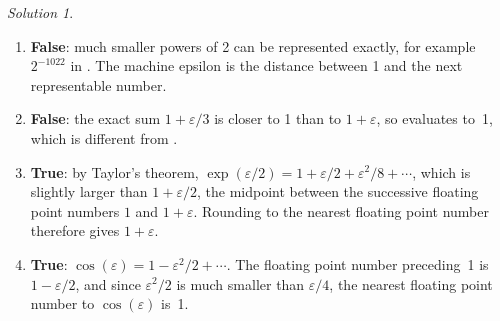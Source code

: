 \documentclass[10pt]{article}
\theoremstyle{definition}
\theoremstyle{remark}
\newtheorem*{protosolution}{Solution}
\newenvironment{solutionframe}
{%
    \begin{mdframed}[
        leftmargin=1cm,
        skipabove=.3cm,
        linecolor=blue,
        backgroundcolor=lightgreen,
        linewidth=0pt,
        innerleftmargin=.5em,
        innerrightmargin=.5em,
        innertopmargin=.3em,
        innerbottommargin=.6em,
    ]
}
{
    \end{mdframed}
}
\newenvironment{solution}
{\pushQED{\qed}\renewcommand{\qedsymbol}{$\triangle$}
\begin{solutionframe}\small \begin{protosolution}}
{\popQED\end{protosolution}\end{solutionframe}}
\begin{document}
\begin{solution}
\begin{enumerate}
        \item \textbf{False}:
            much smaller powers of 2 can be represented exactly,
            for example $2^{-1022}$ in .
            The machine epsilon is the distance between 1 and the next representable number.

        \item \textbf{False}:
            the exact sum $1 + \varepsilon/3$ is closer to 1 than to $1 + \varepsilon$,
            so  evaluates to~1,
            which is different from .

        \item \textbf{True}:
            by Taylor's theorem,
            $\exp(\varepsilon/2) = 1 + \varepsilon/2 + \varepsilon^2/8 + \dotsb$,
            which is slightly larger than $1 + \varepsilon/2$,
            the midpoint between the successive floating point numbers $1$ and $1 + \varepsilon$.
            Rounding to the nearest floating point number therefore gives $1 + \varepsilon$.

        \item \textbf{True}:
            $\cos(\varepsilon) = 1 - \varepsilon^2/2 + \dotsb$.
            The floating point number preceding~1 is $1 - \varepsilon/2$,
            and since $\varepsilon^2/2$ is much smaller than $\varepsilon/4$,
            the nearest floating point number to $\cos(\varepsilon)$ is~1.
    \end{enumerate}
\end{solution}
\end{document}
